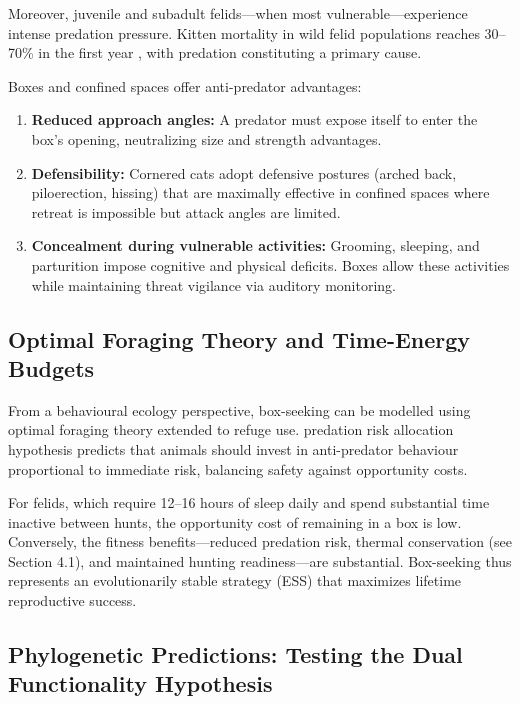 \documentclass[12pt,a4paper]{article}
\begin{document}
Moreover, juvenile and subadult felids—when most vulnerable—experience intense predation pressure. Kitten mortality in wild felid populations reaches 30–70\% in the first year \citep{sunquist2009}, with predation constituting a primary cause.

Boxes and confined spaces offer anti-predator advantages:

\begin{enumerate}
    \item \textbf{Reduced approach angles:} A predator must expose itself to enter the box's opening, neutralizing size and strength advantages.
    
    \item \textbf{Defensibility:} Cornered cats adopt defensive postures (arched back, piloerection, hissing) that are maximally effective in confined spaces where retreat is impossible but attack angles are limited.
    
    \item \textbf{Concealment during vulnerable activities:} Grooming, sleeping, and parturition impose cognitive and physical deficits. Boxes allow these activities while maintaining threat vigilance via auditory monitoring.
\end{enumerate}

\subsection{Optimal Foraging Theory and Time-Energy Budgets}

From a behavioural ecology perspective, box-seeking can be modelled using optimal foraging theory extended to refuge use. \citet{lima1998} predation risk allocation hypothesis predicts that animals should invest in anti-predator behaviour proportional to immediate risk, balancing safety against opportunity costs.

For felids, which require 12–16 hours of sleep daily \citep{adams1986} and spend substantial time inactive between hunts, the opportunity cost of remaining in a box is low. Conversely, the fitness benefits—reduced predation risk, thermal conservation (see Section 4.1), and maintained hunting readiness—are substantial. Box-seeking thus represents an evolutionarily stable strategy (ESS) that maximizes lifetime reproductive success.

\subsection{Phylogenetic Predictions: Testing the Dual Functionality Hypothesis}
\end{document}
